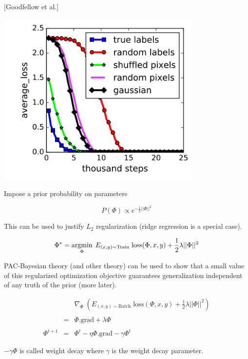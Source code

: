 {\centerline{[Goodfellow et al.]}


\centerline{\includegraphics[width = 4in]{../images/RandomLabels1}}


Impose a prior probability on parameters 

\vfill
$$P(\Phi) \propto e^{-\frac{1}{2}||\Phi||^2}$$

\vfill
This can be used to justify $L_2$ regularization (ridge regression is a special case).

\vfill
$$\Phi^* = \operatorname*{argmin}_\Phi \;E_{(x,y) \sim \mathrm{Train}}\;\mathrm{loss}(\Phi,x,y) + \frac{1}{2}\lambda||\Phi||^2$$

\vfill
PAC-Bayesian theory (and other theory) can be used to show that a small value of this regularized optimization objective guarantees generalization independent of any truth of the prior (more later).


\begin{eqnarray*}
  & & \nabla_\Phi \;\left(E_{(x,y) \sim \mathrm{Batch}}\;\mathrm{loss}(\Phi,x,y) + \frac{1}{2}\lambda||\Phi||^2\right) \\
  \\
  & = & \Phi.\mathrm{grad} + \lambda \Phi \\
  \\
  \Phi^{t+1} & = & \Phi^t - \eta \Phi.\mathrm{grad} - \gamma \Phi^t
\end{eqnarray*}

\vfill
$-\gamma \Phi$ is called weight decay where $\gamma$ is the weight decay parameter. 

}
